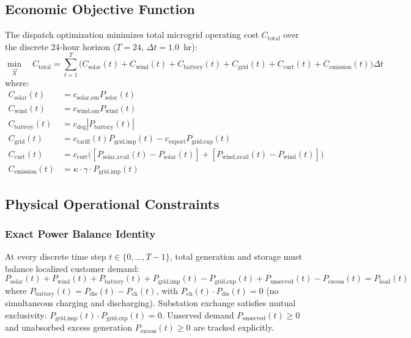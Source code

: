 \documentclass[conference]{IEEEtran}
\begin{document}
\subsection{Economic Objective Function}
The dispatch optimization minimizes total microgrid operating cost $C_{\text{total}}$ over the discrete 24-hour horizon ($T = 24$, $\Delta t = 1.0$~hr):
\begin{equation}
\min_{\vec{X}} \quad C_{\text{total}} = \sum_{t=1}^{T} \Big( C_{\text{solar}}(t) + C_{\text{wind}}(t) + C_{\text{battery}}(t) + C_{\text{grid}}(t) + C_{\text{curt}}(t) + C_{\text{emission}}(t) \Big) \Delta t
\label{eq:objective}
\end{equation}
where:
\begin{align}
C_{\text{solar}}(t) &= c_{\text{solar,om}} P_{\text{solar}}(t) \\
C_{\text{wind}}(t) &= c_{\text{wind,om}} P_{\text{wind}}(t) \\
C_{\text{battery}}(t) &= c_{\text{deg}} |P_{\text{battery}}(t)| \\
C_{\text{grid}}(t) &= c_{\text{tariff}}(t) P_{\text{grid,imp}}(t) - c_{\text{export}} P_{\text{grid,exp}}(t) \\
C_{\text{curt}}(t) &= c_{\text{curt}} \Big( [P_{\text{solar,avail}}(t) - P_{\text{solar}}(t)] + [P_{\text{wind,avail}}(t) - P_{\text{wind}}(t)] \Big) \\
C_{\text{emission}}(t) &= \kappa \cdot \gamma \cdot P_{\text{grid,imp}}(t)
\end{align}

\subsection{Physical Operational Constraints}
\subsubsection{Exact Power Balance Identity}
At every discrete time step $t \in \{0, \dots, T-1\}$, total generation and storage must balance localized customer demand:
\begin{equation}
P_{\text{solar}}(t) + P_{\text{wind}}(t) + P_{\text{battery}}(t) + P_{\text{grid,imp}}(t) - P_{\text{grid,exp}}(t) + P_{\text{unserved}}(t) - P_{\text{excess}}(t) = P_{\text{load}}(t)
\label{eq:power_balance}
\end{equation}
where $P_{\text{battery}}(t) = P_{\text{dis}}(t) - P_{\text{ch}}(t)$, with $P_{\text{ch}}(t) \cdot P_{\text{dis}}(t) = 0$ (no simultaneous charging and discharging). Substation exchange satisfies mutual exclusivity: $P_{\text{grid,imp}}(t) \cdot P_{\text{grid,exp}}(t) = 0$. Unserved demand $P_{\text{unserved}}(t) \ge 0$ and unabsorbed excess generation $P_{\text{excess}}(t) \ge 0$ are tracked explicitly.
\end{document}
